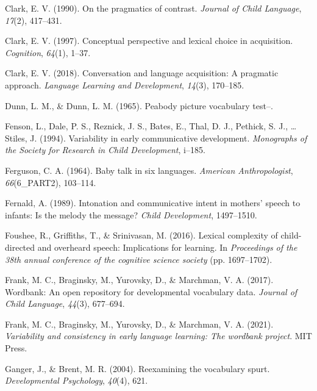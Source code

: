 \documentclass[10pt, letterpaper]{article}
\newenvironment{CSLReferences}%
  {}%
  {\par}
\begin{document}
\begin{CSLReferences}{1}{0}
\leavevmode\hypertarget{ref-clark1990pragmatics}{}%
Clark, E. V. (1990). On the pragmatics of contrast. \emph{Journal of
Child Language}, \emph{17}(2), 417--431.

\leavevmode\hypertarget{ref-clark1997conceptual}{}%
Clark, E. V. (1997). Conceptual perspective and lexical choice in
acquisition. \emph{Cognition}, \emph{64}(1), 1--37.

\leavevmode\hypertarget{ref-clark2018conversation}{}%
Clark, E. V. (2018). Conversation and language acquisition: A pragmatic
approach. \emph{Language Learning and Development}, \emph{14}(3),
170--185.

\leavevmode\hypertarget{ref-dunn1965peabody}{}%
Dunn, L. M., \& Dunn, L. M. (1965). Peabody picture vocabulary test--.

\leavevmode\hypertarget{ref-fenson1994variability}{}%
Fenson, L., Dale, P. S., Reznick, J. S., Bates, E., Thal, D. J.,
Pethick, S. J., \ldots{} Stiles, J. (1994). Variability in early
communicative development. \emph{Monographs of the Society for Research
in Child Development}, i--185.

\leavevmode\hypertarget{ref-ferguson1964baby}{}%
Ferguson, C. A. (1964). Baby talk in six languages. \emph{American
Anthropologist}, \emph{66}(6\_PART2), 103--114.

\leavevmode\hypertarget{ref-fernald1989intonation}{}%
Fernald, A. (1989). Intonation and communicative intent in mothers'
speech to infants: Is the melody the message? \emph{Child Development},
1497--1510.

\leavevmode\hypertarget{ref-foushee2016lexical}{}%
Foushee, R., Griffiths, T., \& Srinivasan, M. (2016). Lexical complexity
of child-directed and overheard speech: Implications for learning. In
\emph{Proceedings of the 38th annual conference of the cognitive science
society} (pp. 1697--1702).

\leavevmode\hypertarget{ref-frank2017wordbank}{}%
Frank, M. C., Braginsky, M., Yurovsky, D., \& Marchman, V. A. (2017).
Wordbank: An open repository for developmental vocabulary data.
\emph{Journal of Child Language}, \emph{44}(3), 677--694.

\leavevmode\hypertarget{ref-frank2021variability}{}%
Frank, M. C., Braginsky, M., Yurovsky, D., \& Marchman, V. A. (2021).
\emph{Variability and consistency in early language learning: The
wordbank project}. MIT Press.

\leavevmode\hypertarget{ref-ganger2004reexamining}{}%
Ganger, J., \& Brent, M. R. (2004). Reexamining the vocabulary spurt.
\emph{Developmental Psychology}, \emph{40}(4), 621.


\end{CSLReferences}
\end{document}
